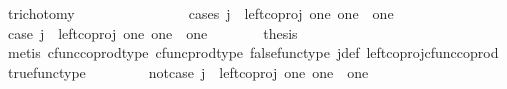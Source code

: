 \begin{isabellebody}
\ trichotomy{\isacharcolon}{\kern0pt}\ {\isachardoublequoteopen}{\isacharparenleft}{\kern0pt}{\isasymlangle}{\isasymf}{\isacharcomma}{\kern0pt}{\isasymf}{\isasymrangle}\ {\isacharequal}{\kern0pt}\ {\isasymlangle}{\isasymt}{\isacharcomma}{\kern0pt}{\isasymt}{\isasymrangle}{\isacharparenright}{\kern0pt}\ {\isasymor}\ {\isacharparenleft}{\kern0pt}{\isasymlangle}{\isasymt}{\isacharcomma}{\kern0pt}\ {\isasymf}{\isasymrangle}\ {\isacharequal}{\kern0pt}\ {\isasymlangle}{\isasymt}{\isacharcomma}{\kern0pt}{\isasymt}{\isasymrangle}{\isacharparenright}{\kern0pt}\ {\isasymor}\ {\isacharparenleft}{\kern0pt}{\isasymlangle}{\isasymf}{\isacharcomma}{\kern0pt}\ {\isasymt}{\isasymrangle}\ {\isacharequal}{\kern0pt}\ {\isasymlangle}{\isasymt}{\isacharcomma}{\kern0pt}{\isasymt}{\isasymrangle}{\isacharparenright}{\kern0pt}{\isachardoublequoteclose}\isanewline
\ \ \isamarkupfalse%
{\isacharparenleft}{\kern0pt}cases\ {\isachardoublequoteopen}j\ {\isacharequal}{\kern0pt}\ left{\isacharunderscore}{\kern0pt}coproj\ one\ {\isacharparenleft}{\kern0pt}one\ {\isasymCoprod}\ one{\isacharparenright}{\kern0pt}{\isachardoublequoteclose}{\isacharparenright}{\kern0pt}\isanewline
\ \ \ \ \isamarkupfalse%
\ case{}{\isacharcolon}{\kern0pt}\ {\isachardoublequoteopen}j\ {\isacharequal}{\kern0pt}\ left{\isacharunderscore}{\kern0pt}coproj\ one\ {\isacharparenleft}{\kern0pt}one\ {\isasymCoprod}\ one{\isacharparenright}{\kern0pt}{\isachardoublequoteclose}\isanewline
\ \ \ \ \isamarkupfalse%
\ \isamarkupfalse%
\ {\isacharquery}{\kern0pt}thesis\isanewline
\ \ \ \ \ \ \isamarkupfalse%
\ {\isacharparenleft}{\kern0pt}metis\ cfunc{\isacharunderscore}{\kern0pt}coprod{\isacharunderscore}{\kern0pt}type\ cfunc{\isacharunderscore}{\kern0pt}prod{\isacharunderscore}{\kern0pt}type\ false{\isacharunderscore}{\kern0pt}func{\isacharunderscore}{\kern0pt}type\ j{\isacharunderscore}{\kern0pt}def\ left{\isacharunderscore}{\kern0pt}coproj{\isacharunderscore}{\kern0pt}cfunc{\isacharunderscore}{\kern0pt}coprod\ true{\isacharunderscore}{\kern0pt}func{\isacharunderscore}{\kern0pt}type{\isacharparenright}{\kern0pt}\isanewline
\ \ \isamarkupfalse%
\isanewline
\ \ \ \ \isamarkupfalse%
\ not{\isacharunderscore}{\kern0pt}case{}{\isacharcolon}{\kern0pt}\ {\isachardoublequoteopen}j\ {\isasymnoteq}\ left{\isacharunderscore}{\kern0pt}coproj\ one\ {\isacharparenleft}{\kern0pt}one\ {\isasymCoprod}\ one{\isacharparenright}{\kern0pt}{\isachardoublequoteclose}\isanewline
\ \ \ \ \isamarkupfalse%

\end{isabellebody}
